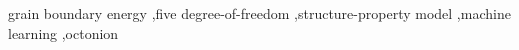 \documentclass[final,twocolumn,12pt]{elsarticle}
\begin{document}
\begin{frontmatter}
		
		
		
		
		
		
		
		
		
		
		\begin{keyword}
			grain boundary energy \sep five degree-of-freedom \sep structure-property model \sep machine learning \sep octonion %
		\end{keyword}
		
	\end{frontmatter}
	
\end{document}
